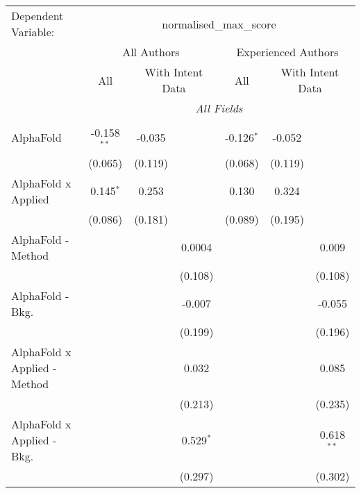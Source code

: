 \begingroup
\centering
\begin{tabular}{lcccccc}
   \tabularnewline \midrule \midrule
   Dependent Variable: & \multicolumn{6}{c}{normalised\_max\_score}\\
 & \multicolumn{3}{c}{All Authors} & \multicolumn{3}{c}{Experienced Authors} \\
\cmidrule(lr){2-4} \cmidrule(lr){5-7}
 & \multicolumn{1}{c}{All} & \multicolumn{2}{c}{With Intent Data} & \multicolumn{1}{c}{All} & \multicolumn{2}{c}{With Intent Data} \\
\cmidrule(lr){2-2} \cmidrule(lr){3-4} \cmidrule(lr){5-5} \cmidrule(lr){6-7}
 & \multicolumn{6}{c}{\textit{All Fields}} \\ \\
   AlphaFold                      & -0.158$^{**}$ & -0.035  &              & -0.126$^{*}$ & -0.052  &   \\   
                                  & (0.065)       & (0.119) &              & (0.068)      & (0.119) &   \\   
   AlphaFold x Applied            & 0.145$^{*}$   & 0.253   &              & 0.130        & 0.324   &   \\   
                                  & (0.086)       & (0.181) &              & (0.089)      & (0.195) &   \\   
   AlphaFold - Method             &               &         & 0.0004       &              &         & 0.009\\   
                                  &               &         & (0.108)      &              &         & (0.108)\\   
   AlphaFold - Bkg.               &               &         & -0.007       &              &         & -0.055\\   
                                  &               &         & (0.199)      &              &         & (0.196)\\   
   AlphaFold x Applied - Method   &               &         & 0.032        &              &         & 0.085\\   
                                  &               &         & (0.213)      &              &         & (0.235)\\   
   AlphaFold x Applied - Bkg.     &               &         & 0.529$^{*}$  &              &         & 0.618$^{**}$\\   
                                  &               &         & (0.297)      &              &         & (0.302)\\   

\end{tabular}
